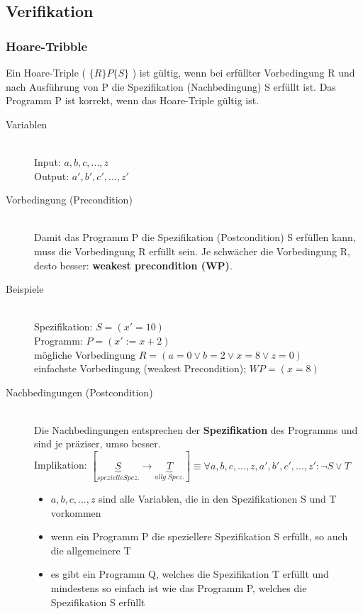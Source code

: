 \documentclass[a4paper,10pt]{article}
\newcommand{\Bold}[1]{\textbf{#1}} %
\newcommand{\ra}{\rightarrow}
\begin{document}
\subsection{Verifikation}
\subsubsection{Hoare-Tribble}
Ein Hoare-Triple ( $\{ R \} P \{ S \}$ ) ist g\"ultig, wenn bei erf\"ullter Vorbedingung R und nach Ausf\"uhrung von P die Spezifikation (Nachbedingung) S erf\"ullt ist. Das Programm P ist korrekt, wenn das Hoare-Triple g\"ultig ist.
\begin{description}
	\item[Variablen] \hfill \\
		Input: $a, b, c, ..., z$ \\
		Output: $a', b', c', ..., z'$
	\item[Vorbedingung (Precondition)] \hfill \\
		Damit das Programm P die Spezifikation (Postcondition) S erf\"ullen kann, muss die Vorbedingung R erf\"ullt sein. Je schw\"acher die Vorbedingung R, desto besser: \Bold {weakest precondition (WP)}.
	\item[Beispiele] \hfill \\
		Spezifikation: $S = (x' = 10)$ \\
		Programm: $P = (x' := x + 2)$ \\
		m\"ogliche Vorbedingung $R = (a = 0 \vee b = 2 \vee x = 8 \vee z = 0)$ \\
		einfachste Vorbedingung (weakest Precondition);  $WP = (x = 8)$
	\item[Nachbedingungen (Postcondition)] \hfill \\
		Die Nachbedingungen entsprechen der \Bold {Spezifikation} des Programms und sind je pr\"aziser, umso besser. \\
		Implikation: $[\underbrace{S}_{spezielle Spez.} \ra \underbrace{T}_{allg. Spez.}] \equiv \forall a, b, c, ..., z, a', b', c', ..., z': \neg S \vee T$
		\begin{itemize}
			\item $a, b, c, ..., z$ sind alle Variablen, die in den Spezifikationen S und T vorkommen
			\item wenn ein Programm P die speziellere Spezifikation S erfüllt, so auch die allgemeinere T
			\item es gibt ein Programm Q, welches die Spezifikation T erf\"ullt und mindestens so einfach ist wie das Programm P, welches die Spezifikation S erf\"ullt

\end{itemize}
\end{description}
\end{document}
